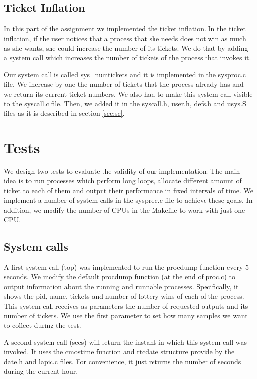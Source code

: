 \documentclass[10pt]{scrartcl}
\begin{document}
\subsection{Ticket Inflation}\label{sec:ti}
In this part of the assignment we implemented the ticket inflation. In the ticket inflation, if the user notices that a process that she needs does not win as much as she wants, she could increase  the number of its tickets. We do that by adding a system call which increases the number of tickets of the process that invokes it. 

\par Our system call is called sys\_numtickets and it is implemented in the sysproc.c file. We increase by one the number of tickets that the process already has and we return its current ticket numbers. We also had to make this system call visible to the syscall.c file. Then, we added it in the syscall.h, user.h, defs.h and usys.S files as it is described in section \ref{sec:sc}.

\section{Tests}

We design two tests to evaluate the validity of our implementation. The main idea is to run processes which  perform long loops, allocate different amount of ticket to each of them and output their performance in fixed intervals of time.  We implement a number of system calls in the sysproc.c file to achieve these goals.  In addition, we modify the number of CPUs in the Makefile to work with just one CPU.

\subsection{System calls}
A first system call (top) was implemented to run the procdump function every 5 seconds. We modify the default procdump function (at the end of proc.c) to output information about the running and runnable processes.  Specifically, it shows the pid, name, tickets and number of lottery wins of each of the process. This system call receives as parameters the number of requested outputs and its number of tickets.  We use the first parameter to set how many samples we want to collect during the test.

A second system call (secs) will return the instant in which this system call was invoked.  It uses the cmostime function and rtcdate structure provide by the date.h and lapic.c files.  For convenience, it just returns the number of seconds during the current hour.
\end{document}
